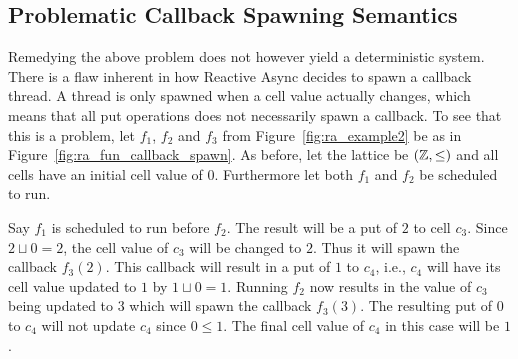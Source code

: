 \subsection{Problematic Callback Spawning Semantics}%
\label{sub:problematic_callback_spawning_semantics}

Remedying the above problem does not however yield a deterministic system.
There is a flaw inherent in how Reactive Async decides to spawn a callback
thread. A thread is only spawned when a cell value actually changes, which means
that all put operations does not necessarily spawn a callback. To see that this
is a problem, let $f_1$, $f_2$ and $f_3$ from Figure~\ref{fig:ra_example2} be as in
Figure~\ref{fig:ra_fun_callback_spawn}. As before, let the lattice be
$(\mathbb{Z}, \leq)$ and all cells have an initial cell value of $0$. Furthermore
let both $f_1$ and $f_2$ be scheduled to run.

Say $f_1$ is scheduled to run before $f_2$. The result will be a put of $2$ to
cell $c_3$.  Since $2 \sqcup 0 = 2$, the cell value of $c_3$ will be changed to
$2$. Thus it will spawn the callback $f_3(2)$. This callback will result in a
put of $1$ to $c_4$, i.e., $c_4$ will have its cell value updated to $1$ by $1
\sqcup 0 = 1$.  Running $f_2$ now results in the value of $c_3$ being updated to
$3$ which will spawn the callback $f_3(3)$. The resulting put of $0$ to $c_4$
will not update $c_4$ since $0 \leq 1$. The final cell value of $c_4$ in this
case will be $1$.

